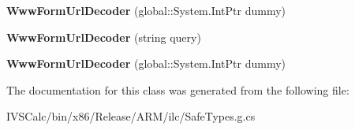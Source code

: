 \begin{DoxyCompactItemize}
{\bfseries Www\+Form\+Url\+Decoder} (global\+::\+System.\+Int\+Ptr dummy)
\item 
\mbox{\label{class_windows_1_1_foundation_1_1_www_form_url_decoder_a370de7a22a401b3861eba333c363e976}} 
{\bfseries Www\+Form\+Url\+Decoder} (string query)
\item 
\mbox{\label{class_windows_1_1_foundation_1_1_www_form_url_decoder_a0128875a3de9151ad0bc6e5889715e32}} 
{\bfseries Www\+Form\+Url\+Decoder} (global\+::\+System.\+Int\+Ptr dummy)
\end{DoxyCompactItemize}


The documentation for this class was generated from the following file\+:\begin{DoxyCompactItemize}
\item 
I\+V\+S\+Calc/bin/x86/\+Release/\+A\+R\+M/ilc/Safe\+Types.\+g.\+cs\end{DoxyCompactItemize}
